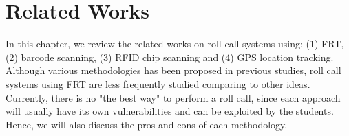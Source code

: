 \chapter{Related Works}
In this chapter, we review the related works on roll call systems using:
(1) FRT, (2) barcode scanning, (3) RFID chip scanning and (4) GPS location tracking.
Although various methodologies has been proposed in previous studies, roll call systems
using FRT are less frequently studied comparing to other ideas. Currently, there is no
"the best way" to perform a roll call, since each approach will usually have
its own vulnerabilities and can be exploited by the students. Hence, we will also
discuss the pros and cons of each methodology.





